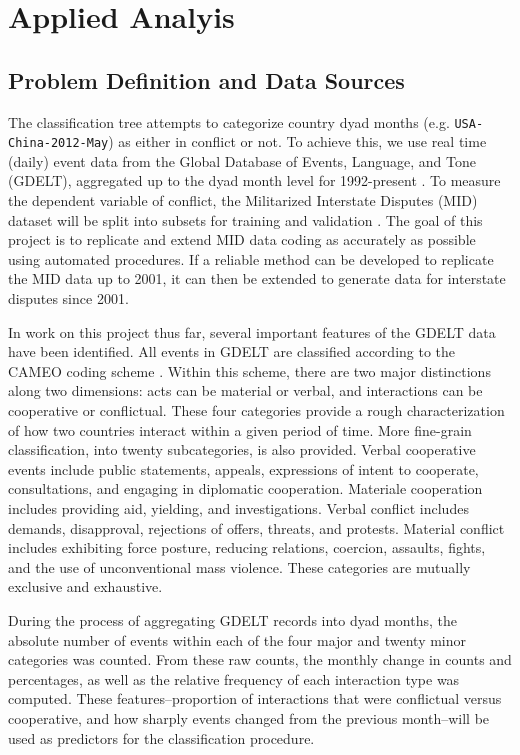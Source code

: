 \documentclass[12pt,letterpaper]{article}
\begin{document}
\section{Applied Analyis}
\label{analysis}

\subsection{Problem Definition and Data Sources}

The classification tree attempts to categorize country dyad months (e.g. \texttt{USA-China-2012-May}) as either in conflict or not. To achieve this, we use real time (daily) event data from the Global Database of Events, Language, and Tone (GDELT), aggregated up to the dyad month level for 1992-present \citep{schrodt2013gdelt}. To measure the dependent variable of conflict, the Militarized Interstate Disputes (MID) dataset will be split into subsets for training and validation \citep{ghosn2004mid3}. The goal of this project is to replicate and extend MID data coding as accurately as possible using automated procedures. If a reliable method can be developed to replicate the MID data up to 2001, it can then be extended to generate data for interstate disputes since 2001. 

In work on this project thus far, several important features of the GDELT data have been identified. All events in GDELT are classified according to the CAMEO coding scheme \citep{gerner:etal:2002}. Within this scheme, there are two major distinctions along two dimensions: acts can be material or verbal, and interactions can be cooperative or conflictual. These four categories provide a rough characterization of how two countries interact within a given period of time. More fine-grain classification, into twenty subcategories, is also provided. Verbal cooperative events include public statements, appeals, expressions of intent to cooperate, consultations, and engaging in diplomatic cooperation. Materiale cooperation includes providing aid, yielding, and investigations. Verbal conflict includes demands, disapproval, rejections of offers, threats, and protests. Material conflict includes exhibiting force posture, reducing relations, coercion, assaults, fights, and the use of unconventional mass violence. These categories are mutually exclusive and exhaustive. 

During the process of aggregating GDELT records into dyad months, the absolute number of events within each of the four major and twenty minor categories was counted. From these raw counts, the monthly change in counts and percentages, as well as the relative frequency of each interaction type was computed. These features--proportion of interactions that were conflictual versus cooperative, and how sharply events changed from the previous month--will be used as predictors for the classification procedure. 
\end{document}
